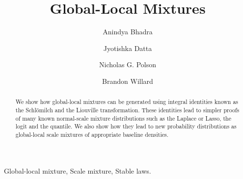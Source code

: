 \documentclass[lineno]{biometrika}
\begin{document}
\jvol{}
\jnum{}



\title{Global-Local Mixtures}

\author{Anindya Bhadra}
\author{Jyotishka Datta}
\author{Nicholas G. Polson \and Brandon Willard }

\maketitle
\begin{abstract}
\noindent 
We show how global-local mixtures can be generated using integral identities known as the Schl\"omilch and the Liouville transformation. These identities lead to simpler proofs of many known normal-scale mixture distributions such as the Laplace or Lasso, the logit and the quantile. We also show how they lead to new probability distributions as global-local scale mixtures of appropriate baseline densities. 
\end{abstract}

\begin{keywords}
Global-local mixture, Scale mixture, Stable laws.
\end{keywords}
\end{document}
